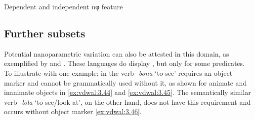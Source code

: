 \documentclass[output=paper]{langsci/langscibook}
\begin{document}
\ea\label{ex:vdwal:3.43} \label{bkm:Ref373481316}
    Dependent and independent uφ feature \\
\z

\subsection{Further subsets}\label{sub:3.3.4}

Potential nanoparametric variation can also be attested in this domain, as
exemplified by  and . These languages do display ,
but only for some predicates. To illustrate with one example: in  the
verb \emph{-bona} ‘to see’ requires an object marker and cannot be
grammatically used without it, as shown for animate and inanimate objects in
\eqref{ex:vdwal:3.44} and \eqref{ex:vdwal:3.45}. The semantically similar verb \emph{-lola}
‘to see/look at’, on the other hand, does not have this requirement and occurs
without object marker \eqref{ex:vdwal:3.46}.
\end{document}
